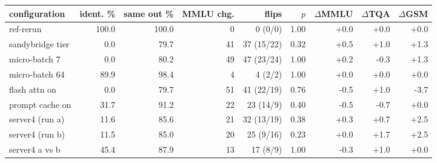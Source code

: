 \begin{tabular}{lrrrrrrrr}
\toprule
configuration & ident. \% & same out \% & MMLU chg. & flips & $p$ & $\Delta$MMLU & $\Delta$TQA & $\Delta$GSM\\
\midrule
ref-rerun & 100.0 & 100.0 & 0 & 0 (0/0) & 1.00 & +0.0 & +0.0 & +0.0\\
sandybridge tier & 0.0 & 79.7 & 41 & 37 (15/22) & 0.32 & +0.5 & +1.0 & +1.3\\
micro-batch 7 & 0.0 & 80.2 & 49 & 47 (23/24) & 1.00 & +0.2 & -0.3 & +1.3\\
micro-batch 64 & 89.9 & 98.4 & 4 & 4 (2/2) & 1.00 & +0.0 & +0.0 & +0.0\\
flash attn on & 0.0 & 79.7 & 51 & 41 (22/19) & 0.76 & -0.5 & +1.0 & -3.7\\
prompt cache on & 31.7 & 91.2 & 22 & 23 (14/9) & 0.40 & -0.5 & -0.7 & +0.0\\
server4 (run a) & 11.6 & 85.6 & 21 & 32 (13/19) & 0.38 & +0.3 & +0.7 & +2.5\\
server4 (run b) & 11.5 & 85.0 & 20 & 25 (9/16) & 0.23 & +0.0 & +1.7 & +2.5\\
server4 a vs b & 45.4 & 87.9 & 13 & 17 (8/9) & 1.00 & -0.3 & +1.0 & +0.0\\
\bottomrule
\end{tabular}
